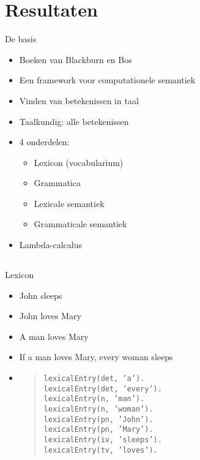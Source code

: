 \documentclass[notes, dvipsnames]{beamer}
\newcommand{\seperation}{
	\vspace{1em}
	\ppause
}
\newcommand{\hitem}{
	\ppause
	\item
}
\newcommand{\ppause}{\onslide<+>}
\begin{document}
  \section{Resultaten}
	\begin{frame}{De basis}
		\begin{itemize}
			\hitem Boeken van Blackburn en Bos \cite{Blackburn2005, Blackburn2006} 
      \item Een framework voor computationele semantiek
      \item Vinden van betekenissen in taal
      \item Taalkundig: alle betekenissen
			
			\seperation
      \item 4 onderdelen:
        \begin{itemize}
          \item Lexicon (vocabularium)
          \item Grammatica
          \item Lexicale semantiek
          \item Grammaticale semantiek
        \end{itemize}
      \item Lambda-calcalus
		\end{itemize}
	\end{frame}

  \subsection{}
	\begin{frame}{Lexicon}
		\begin{itemize}
      \hitem John sleeps
			\item John loves Mary
      \item A man loves Mary
      \item If a man loves Mary, every woman sleeps
      \hitem
        \begin{quote}
          \texttt{lexicalEntry(det, 'a').} \\
          \texttt{lexicalEntry(det, 'every').} \\
          \texttt{lexicalEntry(n, 'man').} \\
          \texttt{lexicalEntry(n, 'woman').} \\
          \texttt{lexicalEntry(pn, 'John').} \\
          \texttt{lexicalEntry(pn, 'Mary').} \\
          \texttt{lexicalEntry(iv, 'sleeps').} \\
          \texttt{lexicalEntry(tv, 'loves').} \\
        \end{quote}
		\end{itemize}
	\end{frame}
\end{document}
